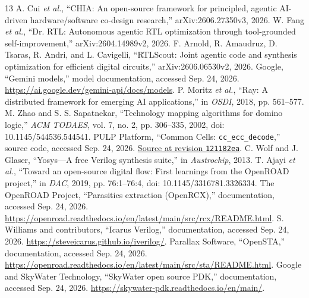 \begin{thebibliography}{13}
 A. Cui \emph{et al.}, ``CHIA: An open-source framework for principled, agentic AI-driven hardware/software co-design research,'' arXiv:2606.27350v3, 2026.
 W. Fang \emph{et al.}, ``Dr. RTL: Autonomous agentic RTL optimization through tool-grounded self-improvement,'' arXiv:2604.14989v2, 2026.
 F. Arnold, R. Amaudruz, D. Tsaras, R. Andri, and L. Cavigelli, ``RTLScout: Joint agentic code and synthesis optimization for efficient digital circuits,'' arXiv:2606.06530v2, 2026.
 Google, ``Gemini models,'' model documentation, accessed Sep. 24, 2026. \url{https://ai.google.dev/gemini-api/docs/models}.
 P. Moritz \emph{et al.}, ``Ray: A distributed framework for emerging AI applications,'' in \emph{OSDI}, 2018, pp. 561--577.
 M. Zhao and S. S. Sapatnekar, ``Technology mapping algorithms for domino logic,'' \emph{ACM TODAES}, vol. 7, no. 2, pp. 306--335, 2002, doi: 10.1145/544536.544541.
 PULP Platform, ``Common Cells: \texttt{cc\_ecc\_decode},'' source code, accessed Sep. 24, 2026. \href{https://github.com/pulp-platform/common_cells/blob/121182eaa0fa1f67b74eaa97c73b8a7133adda6a/src/cc_ecc_decode.sv}{Source at revision \texttt{121182ea}}.
 C. Wolf and J. Glaser, ``Yosys---A free Verilog synthesis suite,'' in \emph{Austrochip}, 2013.
 T. Ajayi \emph{et al.}, ``Toward an open-source digital flow: First learnings from the OpenROAD project,'' in \emph{DAC}, 2019, pp. 76:1--76:4, doi: 10.1145/3316781.3326334.
 The OpenROAD Project, ``Parasitics extraction (OpenRCX),'' documentation, accessed Sep. 24, 2026. \url{https://openroad.readthedocs.io/en/latest/main/src/rcx/README.html}.
 S. Williams and contributors, ``Icarus Verilog,'' documentation, accessed Sep. 24, 2026. \url{https://steveicarus.github.io/iverilog/}.
 Parallax Software, ``OpenSTA,'' documentation, accessed Sep. 24, 2026. \url{https://openroad.readthedocs.io/en/latest/main/src/sta/README.html}.
 Google and SkyWater Technology, ``SkyWater open source PDK,'' documentation, accessed Sep. 24, 2026. \url{https://skywater-pdk.readthedocs.io/en/main/}.
\end{thebibliography}
